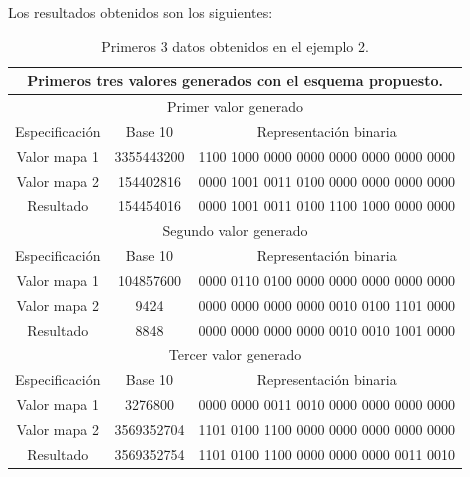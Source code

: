 \documentclass[10pt]{IEEEtran}
\begin{document}
Los resultados obtenidos son los siguientes:


\begin{table}[H]
\centering
\caption{Primeros 3 datos obtenidos en el ejemplo 2.}
\begin{tabular}[c]{|c|c|c|}
\hline

\multicolumn{3}{|c|}{Primeros tres valores generados con el esquema propuesto.}\\
\hline

\hline

\multicolumn{3}{|c|}{Primer valor generado }\\
\hline
Especificación  & Base 10 & Representación binaria \\
\hline
Valor mapa 1 & 3355443200   &  1100 1000 0000 0000 0000 0000 0000 0000\\

\hline
Valor mapa 2 &  154402816  & 0000 1001 0011 0100 0000 0000 0000 0000 \\
\hline
Resultado  &  154454016  &  0000 1001 0011 0100 1100 1000 0000 0000\\
\hline
\hline

\multicolumn{3}{|c|}{ Segundo valor generado }\\
\hline
Especificación  & Base 10 & Representación binaria \\
\hline
Valor mapa 1 & 104857600  & 0000 0110 0100 0000 0000 0000 0000 0000  \\

\hline
Valor mapa 2 &   9424   & 0000 0000 0000 0000 0010 0100 1101 0000\\
\hline
Resultado  & 8848    & 0000 0000 0000 0000 0010 0010 1001 0000  \\
\hline
\hline

\multicolumn{3}{|c|}{Tercer valor generado }\\
\hline
Especificación  & Base 10  & Representación binaria \\
\hline
Valor mapa 1 &  3276800  & 0000 0000 0011 0010 0000 0000 0000 0000  \\

\hline
Valor mapa 2 &  3569352704   &  1101 0100 1100 0000 0000 0000 0000 0000  \\
\hline
Resultado  &  3569352754   & 1101 0100 1100 0000 0000 0000 0011 0010 \\
\hline
\hline

\hline
\hline
\end{tabular}
\end{table}
\end{document}
